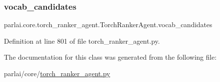 \subsubsection{\texorpdfstring{vocab\+\_\+candidates}{vocab\_candidates}}
{\footnotesize\ttfamily parlai.\+core.\+torch\+\_\+ranker\+\_\+agent.\+Torch\+Ranker\+Agent.\+vocab\+\_\+candidates}



Definition at line 801 of file torch\+\_\+ranker\+\_\+agent.\+py.



The documentation for this class was generated from the following file\+:\begin{DoxyCompactItemize}
\item 
parlai/core/\hyperlink{torch__ranker__agent_8py}{torch\+\_\+ranker\+\_\+agent.\+py}\end{DoxyCompactItemize}
